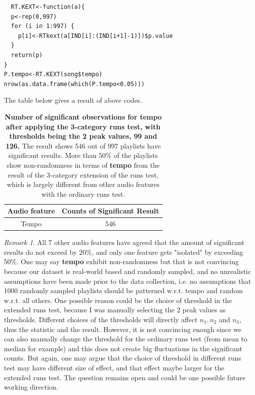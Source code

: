 \documentclass[12pt]{article}
\theoremstyle{plain}
\theoremstyle{definition}
\theoremstyle{remark}
\newtheorem*{remark}{Remark}
\begin{document}
\begin{verbatim}
  RT.KEXT<-function(a){
  p<-rep(0,997)
  for (i in 1:997) {
    p[i]<-RTkext(a[IND[i]:(IND[i+1]-1)])$p.value
  }
  return(p)
}
P.tempo<-RT.KEXT(song$tempo)
nrow(as.data.frame(which(P.tempo<0.05)))
\end{verbatim}

The table below gives a result of above codes.

\begin{table}[h!]
\begin{center}
\begin{tabular}{|c|c|}
    \hline
    Audio feature & Counts of Significant Result\\
    \hline
    Tempo & 546 \\
    \hline
\end{tabular}
\label{table 2}
\caption{\textbf{Number of significant observations for tempo after applying the 3-category runs test, with thresholds being the 2 peak values, 99 and 126.} The result shows 546 out of 997 playlists have significant results. More than 50\% of the playlists show non-randomness in terms of \textbf{tempo} from the result of the 3-category extension of the runs test, which is largely different from other audio features with the ordinary runs test.}
\end{center}
\end{table}

\begin{remark}
All 7 other audio features have agreed that the amount of significant results do not exceed by 20\%, and only one feature gets "isolated" by exceeding 50\%. One may say \textbf{tempo} exhibit non-randomness but that is not convincing because our dataset is real-world based and randomly sampled, and no unrealistic assumptions have been made prior to the data collection, i.e. no assumptions that 1000 randomly sampled playlists should be patterned w.r.t. tempo and random w.r.t. all others. One possible reason could be the choice of threshold in the extended runs test, because I was manually selecting the 2 peak values as thresholds. Different choices of the thresholds will directly affect $n_1,n_2$ and $n_3$, thus the statistic and the result. However, it is not convincing enough since we can also manually change the threshold for the ordinary runs test (from mean to median for example) and this does not create big fluctuations in the significant counts. But again, one may argue that the choice of threshold in different runs test may have different size of effect, and that effect maybe larger for the extended runs test. The question remains open and could be one possible future working direction.
\end{remark}
\end{document}
